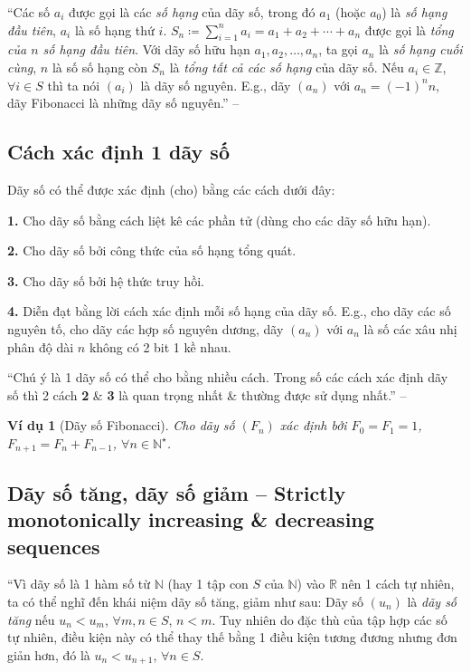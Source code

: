 \documentclass[oneside]{book}
\numberwithin{equation}{section}
\newtheorem{vidu}{Ví dụ}[section]
\begin{document}
``Các số $a_i$ được gọi là các \textit{số hạng} của dãy số, trong đó $a_1$ (hoặc $a_0$) là \textit{số hạng đầu tiên}, $a_i$ là số hạng thứ $i$. $S_n\coloneqq\sum_{i=1}^n a_i = a_1 + a_2 + \cdots + a_n$ được gọi là \textit{tổng của $n$ số hạng đầu tiên}. Với dãy số hữu hạn $a_1,a_2,\ldots,a_n$, ta gọi $a_n$ là \textit{số hạng cuối cùng}, $n$ là số số hạng còn $S_n$ là \textit{tổng tất cả các số hạng} của dãy số. Nếu $a_i\in\mathbb{Z}$, $\forall i\in S$ thì ta nói $(a_i)$ là dãy số nguyên. E.g., dãy $(a_n)$ với $a_n = (-1)^nn$, dãy Fibonacci là những dãy số nguyên.'' -- \cite[p. 118]{TL_chuyen_Toan_Dai_So_Giai_Tich_11}

\subsection{Cách xác định 1 dãy số}
Dãy số có thể được xác định (cho) bằng các cách dưới đây:
\begin{enumerate*}
	\item[\textbf{1.}] Cho dãy số bằng cách liệt kê các phần tử (dùng cho các dãy số hữu hạn).
	\item[\textbf{2.}] Cho dãy số bởi công thức của số hạng tổng quát.
	\item[\textbf{3.}] Cho dãy số bởi hệ thức truy hồi.
	\item[\textbf{4.}] Diễn đạt bằng lời cách xác định mỗi số hạng của dãy số. E.g., cho dãy các số nguyên tố, cho dãy các hợp số nguyên dương, dãy $(a_n)$ với $a_n$ là số các xâu nhị phân độ dài $n$ không có 2 bit 1 kề nhau.
\end{enumerate*}

``Chú ý là 1 dãy số có thể cho bằng nhiều cách. Trong số các cách xác định dãy số thì 2 cách \textbf{2} \& \textbf{3} là quan trọng nhất \& thường được sử dụng nhất.'' -- \cite[p. 119]{TL_chuyen_Toan_Dai_So_Giai_Tich_11}

\begin{vidu}[Dãy số Fibonacci]
	Cho dãy số $(F_n)$ xác định bởi $F_0 = F_1 = 1$, $F_{n+1} = F_n + F_{n-1}$, $\forall n\in\mathbb{N}^\star$.
\end{vidu}

\subsection{Dãy số tăng, dãy số giảm -- Strictly monotonically increasing \& decreasing sequences}
``Vì dãy số là 1 hàm số từ $\mathbb{N}$ (hay 1 tập con $S$ của $\mathbb{N}$) vào $\mathbb{R}$ nên 1 cách tự nhiên, ta có thể nghĩ đến khái niệm dãy số tăng, giảm như sau: Dãy số $(u_n)$ là \textit{dãy số tăng} nếu $u_n < u_m$, $\forall m,n\in S$, $n < m$. Tuy nhiên do đặc thù của tập hợp các số tự nhiên, điều kiện này có thể thay thế bằng 1 điều kiện tương đương nhưng đơn giản hơn, đó là $u_n < u_{n+1}$, $\forall n\in S$.
\end{document}
